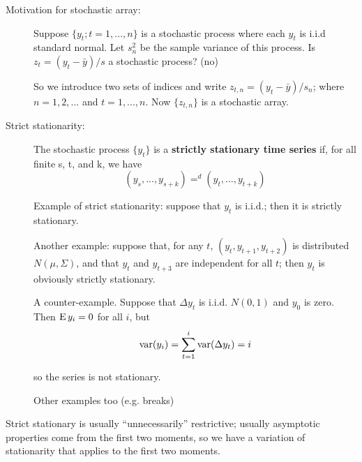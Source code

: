 \begin{description}
\item[Motivation for stochastic array:]
  Suppose $\{y_t; t=1,...,n\}$ is a stochastic process where each
  $y_t$ is i.i.d standard normal. Let $s^2_n$ be the sample variance
  of this process. Is $z_t = (y_t - \bar y) / s$ a stochastic process?
  (no)

  So we introduce two sets of indices and write $z_{t,n} = (y_t - \bar
  y) / s_n$; where $n = 1,2,...$ and $t = 1,...,n$.  Now $\{z_{t,n}\}$
  is a stochastic array.
\item[Strict stationarity:]
  The stochastic process $\{y_t\}$ is a \textbf{strictly stationary
    time series} if, for all finite s, t, and k, we have
  \[(y_s,...,y_{s+k}) =^d (y_t,...,y_{t+k})\]

  Example of strict stationarity: suppose that $y_t$ is i.i.d.; then
  it is strictly stationary.

  Another example: suppose that, for any $t$, $(y_t, y_{t+1},
  y_{t+2})$ is distributed $N(\mu,\Sigma)$, and that $y_t$ and $y_{t+3}$ are
  independent for all $t$; then $y_t$ is obviously strictly
  stationary.

  A counter-example. Suppose that $\Delta y_t$ is i.i.d. $N(0,1)$ and $y_0$
  is zero. Then $\operatorname{E} y_i = 0$ for all $i$, but
  \[\operatorname{var}(y_i) = \sum_{t=1}^i \operatorname{var}(\Delta y_t) = i\]

  so the series is not stationary.

  Other examples too (e.g. breaks)
\end{description}

Strict stationary is usually ``unnecessarily'' restrictive; usually
asymptotic properties come from the first two moments, so we have a
variation of stationarity that applies to the first two moments.

